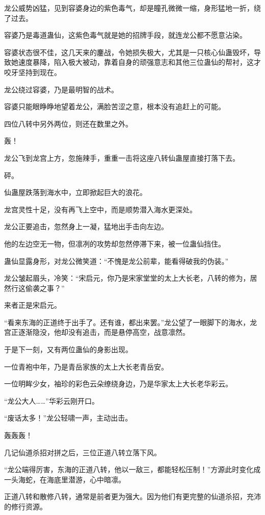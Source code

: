 \begin{this_body}
龙公威势凶猛，见到容婆身边的紫色毒气，却是瞳孔微微一缩，身形猛地一折，绕了过去。

容婆乃是毒道蛊仙，这紫色毒气就是她的招牌手段，就连龙公都不愿意沾染。

容婆状态很不佳，这几天来的鏖战，令她损失极大，尤其是一只核心仙蛊毁坏，导致她速度暴降，陷入极大被动，靠着自身的顽强意志和其他三位蛊仙的帮衬，这才咬牙坚持到现在。

龙公绕过容婆，乃是最明智的战术。

容婆只能眼睁睁地望着龙公，满脸苦涩之意，根本没有追赶上的可能。

四位八转中另外两位，则还在数里之外。

轰！

龙公飞到龙宫上方，忽施辣手，重重一击将这座八转仙蛊屋直接打落下去。

砰。

仙蛊屋跌落到海水中，立即掀起巨大的浪花。

龙宫灵性十足，没有再飞上空中，而是顺势潜入海水更深处。

龙公正要追击，忽然身上一凝，猛地出手击向左边。

他的左边空无一物，但凛冽的攻势却忽然停滞下来，被一位蛊仙挡住。

蛊仙显露身形，对龙公微笑道：“不愧是龙公前辈，能看得破我的伪装。”

龙公皱起眉头，冷笑：“宋启元，你乃是宋家堂堂的太上大长老，八转的修为，居然行这偷袭之事？”

来者正是宋启元。

“看来东海的正道终于出手了。还有谁，都出来罢。”龙公望了一眼脚下的海水，龙宫正逐渐隐没，他却没有追击，而是悬停高空，战意凛然。

于是下一刻，又有两位蛊仙的身影出现。

一位青袍中年，乃是青岳家族的太上大长老青岳安。

一位明眸少女，袖珍的彩色云朵缭绕身边，乃是华家太上大长老华彩云。

“龙公大人……”华彩云刚开口。

“废话太多！”龙公轻啸一声，主动出击。

轰轰轰！

几记仙道杀招对拼之后，三位正道八转立落下风。

“龙公端得厉害，东海的正道八转，他以一敌三，都能轻松压制！”方源此时变化成一头海蛇，在海底里潜游，心中暗凛。

正道八转和散修八转，通常是前者更为强大。因为他们有更完整的仙道杀招，充沛的修行资源。


\end{this_body}
